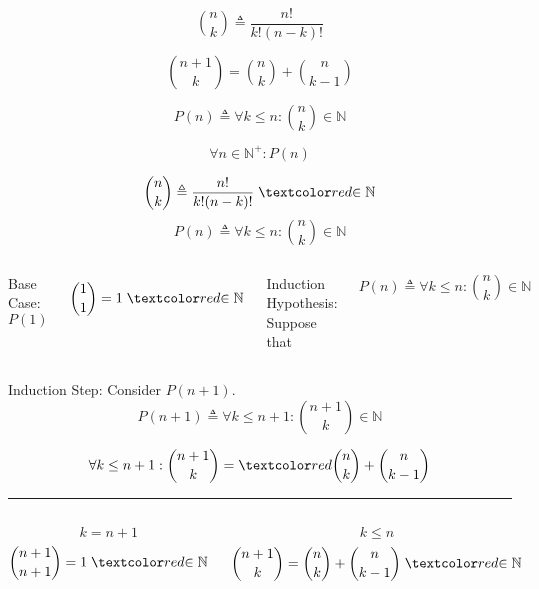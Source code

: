 \begin{frame}{}
  \[
    {n \choose k} \triangleq \frac{n!}{k! (n-k)!}
  \]

  \pause
  \vspace{0.60cm}
  \[
    {n+1 \choose k} = {n \choose k} + {n \choose k-1}
  \]

  \pause
  \vspace{0.30cm}
  \begin{center}
  \end{center}

  \pause
  \[
    P(n) \triangleq \forall k \le n: {n \choose k} \in \mathbb{N}
  \]

  \pause
  \[
    \forall n \in \mathbb{N}^{+}: P(n)
  \]
\end{frame}

\begin{frame}
  \[
    {n \choose k} \triangleq \frac{n!}{k! (n-k)!}\; \red{\in \mathbb{N}}
  \]
  \[
    P(n) \triangleq \forall k \le n: {n \choose k} \in \mathbb{N}
  \]
  \begin{center}
  \end{center}

  \pause
  \vspace{0.30cm}
  \begin{columns}
      \begin{center}
	Base Case: $P(1)$
      \end{center}
      \[
	{1 \choose 1} = 1 \;\red{\in \mathbb{N}}
      \]
      \begin{center}
	Induction Hypothesis: Suppose that
      \end{center}
      \[
	P(n) \triangleq \forall k \le n: {n \choose k} \in \mathbb{N}
      \]
  \end{columns}
\end{frame}

\begin{frame}{}
  \begin{center}
    Induction Step: Consider $P(n+1)$.
    \[
      P(n+1) \triangleq \forall k \le n+1: {n+1 \choose k} \in \mathbb{N}
    \]

    \pause
    \[
      \forall k \le n+1: {n+1 \choose k} = \red{{n \choose k}} + {n \choose k-1}
    \]

    \pause
    \hrule
    \begin{columns}
	\begin{center}
	  \[
	    k = n+1
	  \]
	  \[
	    {n+1 \choose n+1} = 1\; \red{\in \mathbb{N}}
	  \]
	\end{center}
        \pause
	\begin{center}
	  \[
	    k \le n
	  \]
	  \[
	    {n+1 \choose k} = {n \choose k} + {n \choose k-1}\; \red{\in \mathbb{N}}
	  \]
	\end{center}
    \end{columns}
  \end{center}
\end{frame}


